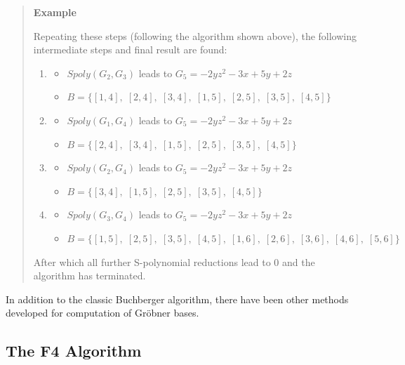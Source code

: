 \documentclass[letterpaper,12pt,titlepage,oneside,final]{book}
\newenvironment{example}{\begin{quote}%
  \textbf{Example }%
  \quad
}{%
\end{quote}%
}
\begin{document}
\begin{example}
  Repeating these steps (following the algorithm shown above), the following intermediate steps and final result are found:
  \begin{enumerate}
    \item \begin{itemize} \item ${Spoly( G_2, G_3)}$ leads to ${G_5 = -2yz^2 - 3x + 5y + 2z}$ \item ${B = \{[1, 4],\; [2, 4],\; [3, 4],\; [1, 5],\; [2, 5],\; [3, 5],\; [4, 5]\}}$ \end{itemize}
    \item \begin{itemize} \item ${Spoly( G_1, G_4)}$ leads to ${G_5 = -2yz^2 - 3x + 5y + 2z}$ \item ${B = \{[2, 4],\; [3, 4],\; [1, 5],\; [2, 5],\; [3, 5],\; [4, 5]\}}$ \end{itemize}
    \item \begin{itemize} \item ${Spoly( G_2, G_4)}$ leads to ${G_5 = -2yz^2 - 3x + 5y + 2z}$ \item ${B = \{[3, 4],\; [1, 5],\; [2, 5],\; [3, 5],\; [4, 5]\}}$ \end{itemize}
    \item \begin{itemize} \item ${Spoly( G_3, G_4)}$ leads to ${G_5 = -2yz^2 - 3x + 5y + 2z}$ \item ${B = \{[1, 5],\; [2, 5],\; [3, 5],\; [4, 5],\; [1, 6],\; [2, 6],\; [3, 6],\; [4, 6],\; [5, 6]\}}$ \end{itemize}
  \end{enumerate}
  After which all further S-polynomial reductions lead to 0 and the algorithm has terminated.
\end{example}

In addition to the classic Buchberger algorithm, there have been other methods developed for computation of Gr\"obner bases.  

\subsection{The F4 Algorithm}
\end{document}
